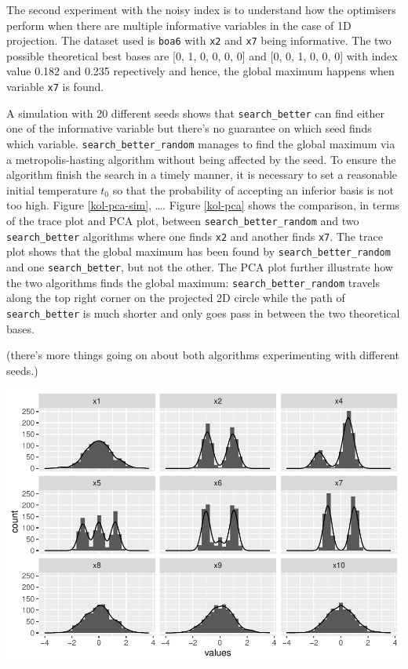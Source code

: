 \documentclass[12pt]{article}
\begin{document}
The second experiment with the noisy index is to understand how the optimisers perform when there are multiple informative variables in the case of 1D projection. The dataset used is \texttt{boa6} with \texttt{x2} and \texttt{x7} being informative. The two possible theoretical best bases are {[}0, 1, 0, 0, 0, 0{]} and {[}0, 0, 1, 0, 0, 0{]} with index value 0.182 and 0.235 repectively and hence, the global maximum happens when variable \texttt{x7} is found.

A simulation with 20 different seeds shows that \texttt{search\_better} can find either one of the informative variable but there's no guarantee on which seed finds which variable. \texttt{search\_better\_random} manages to find the global maximum via a metropolis-hasting algorithm without being affected by the seed. To ensure the algorithm finish the search in a timely manner, it is necessary to set a reasonable initial temperature \(t_0\) so that the probability of accepting an inferior basis is not too high. Figure \ref{kol-pca-sim}, \ldots{}. Figure \ref{kol-pca} shows the comparison, in terms of the trace plot and PCA plot, between \texttt{search\_better\_random} and two \texttt{search\_better} algorithms where one finds \texttt{x2} and another finds \texttt{x7}. The trace plot shows that the global maximum has been found by \texttt{search\_better\_random} and one \texttt{search\_better}, but not the other. The PCA plot further illustrate how the two algorithms finds the global maximum: \texttt{search\_better\_random} travels along the top right corner on the projected 2D circle while the path of \texttt{search\_better} is much shorter and only goes pass in between the two theoretical bases.

(there's more things going on about both algorithms experimenting with different seeds.)

\includegraphics{paper_files/figure-latex/unnamed-chunk-2-1.pdf}
\end{document}
